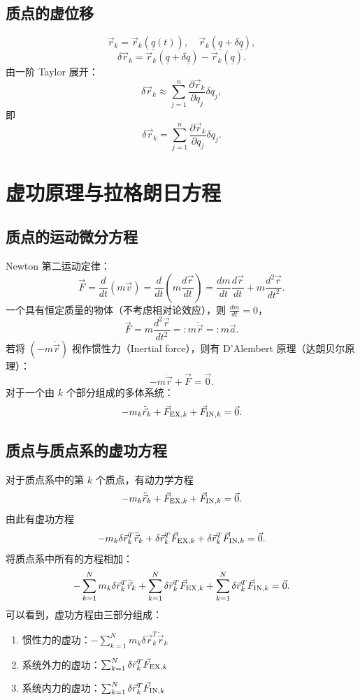 \subsection{质点的虚位移}
\[
\vec{r}_k = \vec{r}_k(\underline{q}(t)), \quad \vec{r}_k(\underline{q} + \delta \underline{q}),
\]
\[
\delta \vec{r}_k = \vec{r}_k(\underline{q} + \delta \underline{q}) - \vec{r}_k(\underline{q}).
\]
由一阶 Taylor 展开：
\[
\delta \vec{r}_k \approx \sum_{j=1}^n \frac{\partial \vec{r}_k}{\partial q_j} \delta q_j,
\]
即
\[
\delta \vec{r}_k = \sum_{j=1}^n \frac{\partial \vec{r}_k}{\partial q_j} \delta q_j.
\]

\section{虚功原理与拉格朗日方程}
\subsection{质点的运动微分方程}
Newton 第二运动定律：
\[
\vec{F} = \frac{d}{dt}(m \vec{v}) = \frac{d}{dt}\left(m \frac{d \vec{r}}{dt}\right) = \frac{dm}{dt} \frac{d \vec{r}}{dt} + m \frac{d^2 \vec{r}}{dt^2}.
\]
一个具有恒定质量的物体（不考虑相对论效应），则 \( \frac{dm}{dt} = 0 \)，
\[
\vec{F} = m \frac{d^2 \vec{r}}{dt^2} =: m \ddot{\vec{r}} =: m \vec{a}.
\]
若将 \( (-m \ddot{\vec{r}}) \) 视作惯性力（Inertial force），则有 D'Alembert 原理（达朗贝尔原理）：
\[
-m \ddot{\vec{r}} + \vec{F} = \vec{0}.
\]
对于一个由 \( k \) 个部分组成的多体系统：
\[
-m_k \ddot{\vec{r}}_k + \vec{F}_{{\rm EX},k} + \vec{F}_{{\rm IN},k} = \vec{0}.
\]

\subsection{质点与质点系的虚功方程}
对于质点系中的第 \( k \) 个质点，有动力学方程
\[
-m_k \ddot{\vec{r}}_k + \vec{F}_{{\rm EX},k} + \vec{F}_{{\rm IN},k} = \vec{0}.
\]
由此有虚功方程
\[
-m_k \delta \vec{r}_k^T \ddot{\vec{r}}_k + \delta \vec{r}_k^T \vec{F}_{{\rm EX},k} + \delta \vec{r}_k^T \vec{F}_{{\rm IN},k} = \vec{0}.
\]
将质点系中所有的方程相加：
\[
-\sum_{k=1}^N m_k \delta \vec{r}_k^T \ddot{\vec{r}}_k + \sum_{k=1}^N \delta \vec{r}_k^T \vec{F}_{{\rm EX},k} + \sum_{k=1}^N \delta \vec{r}_k^T \vec{F}_{{\rm IN},k} = \vec{0}.
\]
可以看到，虚功方程由三部分组成：
\begin{enumerate}
\item 惯性力的虚功：\( -\sum_{k=1}^N m_k \delta \vec{r}_k^T \ddot{\vec{r}}_k \)
\item 系统外力的虚功：\( \sum_{k=1}^N \delta \vec{r}_k^T \vec{F}_{{\rm EX},k} \)
\item 系统内力的虚功：\( \sum_{k=1}^N \delta \vec{r}_k^T \vec{F}_{{\rm IN},k} \)
\end{enumerate}

